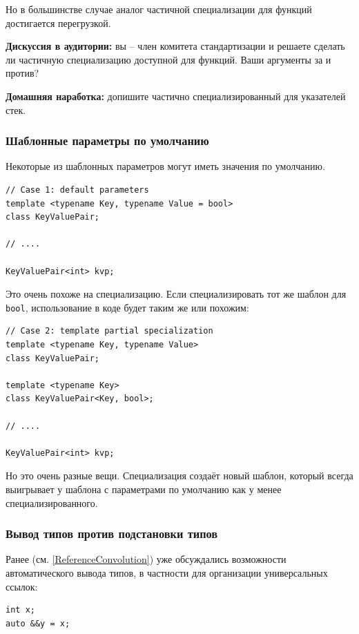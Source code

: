 \documentclass[a4paper,12pt,oneside]{article}
\begin{document}
Но в большинстве случае аналог частичной специализации для функций достигается перегрузкой.

\textbf{Дискуссия в аудитории:} вы -- член комитета стандартизации и решаете сделать ли частичную специализацию доступной для функций. Ваши аргументы за и против?

\textbf{Домашняя наработка:} допишите частично специализированный для указателей стек.

\subsubsection{Шаблонные параметры по умолчанию}

Некоторые из шаблонных параметров могут иметь значения по умолчанию.

\begin{lstlisting}
// Case 1: default parameters
template <typename Key, typename Value = bool>
class KeyValuePair;

// ....

KeyValuePair<int> kvp;
\end{lstlisting}

Это очень похоже на специализацию. Если специализировать тот же шаблон для \lstinline!bool!, использование в коде будет таким же или похожим:

\begin{lstlisting}
// Case 2: template partial specialization
template <typename Key, typename Value>
class KeyValuePair;

template <typename Key>
class KeyValuePair<Key, bool>;

// ....

KeyValuePair<int> kvp;
\end{lstlisting}

Но это очень разные вещи. Специализация создаёт новый шаблон, который всегда выигрывает у шаблона с параметрами по умолчанию как у менее специализированного.

\subsubsection{Вывод типов против подстановки типов}

Ранее (см. \ref{ReferenceConvolution}) уже обсуждались возможности автоматического вывода типов, в частности для организации универсальных ссылок:

\begin{lstlisting}
int x;
auto &&y = x;
\end{lstlisting}
\end{document}
